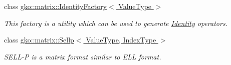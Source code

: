\begin{DoxyCompactItemize}
class \hyperlink{classgko_1_1matrix_1_1IdentityFactory}{gko\+::matrix\+::\+Identity\+Factory$<$ Value\+Type $>$}
\begin{DoxyCompactList}\small\item\em This factory is a utility which can be used to generate \hyperlink{classgko_1_1matrix_1_1Identity}{Identity} operators. \end{DoxyCompactList}\item 
class \hyperlink{classgko_1_1matrix_1_1Sellp}{gko\+::matrix\+::\+Sellp$<$ Value\+Type, Index\+Type $>$}
\begin{DoxyCompactList}\small\item\em S\+E\+L\+L-\/P is a matrix format similar to E\+LL format. \end{DoxyCompactList}\end{DoxyCompactItemize}
